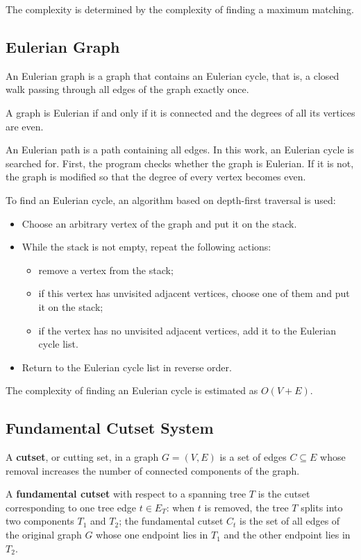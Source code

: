 \documentclass[a4paper,final]{article}
\begin{document}
The complexity is determined by the complexity of finding a maximum matching.

	\subsection{Eulerian Graph}

An Eulerian graph is a graph that contains an Eulerian cycle, that is, a closed walk passing through all edges of the graph exactly once.

A graph is Eulerian if and only if it is connected and the degrees of all its vertices are even.

An Eulerian path is a path containing all edges. In this work, an Eulerian cycle is searched for. First, the program checks whether the graph is Eulerian. If it is not, the graph is modified so that the degree of every vertex becomes even.

To find an Eulerian cycle, an algorithm based on depth-first traversal is used:
\begin{itemize}
  \item Choose an arbitrary vertex of the graph and put it on the stack.
  \item While the stack is not empty, repeat the following actions:
  \begin{itemize}
    \item remove a vertex from the stack;
    \item if this vertex has unvisited adjacent vertices, choose one of them and put it on the stack;
    \item if the vertex has no unvisited adjacent vertices, add it to the Eulerian cycle list.
  \end{itemize}
  \item Return to the Eulerian cycle list in reverse order.
\end{itemize}

The complexity of finding an Eulerian cycle is estimated as $O(V+E)$.

	\subsection{Fundamental Cutset System}

A \textbf{cutset}, or cutting set, in a graph $G = (V, E)$ is a set of edges $C \subseteq E$ whose removal increases the number of connected components of the graph.

A \textbf{fundamental cutset} with respect to a spanning tree $T$ is the cutset corresponding to one tree edge $t \in E_T$: when $t$ is removed, the tree $T$ splits into two components $T_1$ and $T_2$; the fundamental cutset $C_t$ is the set of all edges of the original graph $G$ whose one endpoint lies in $T_1$ and the other endpoint lies in $T_2$.
\end{document}
